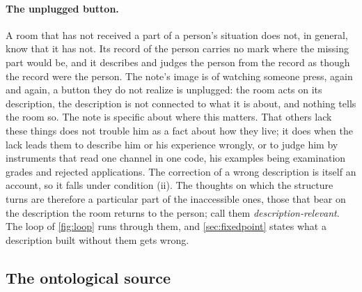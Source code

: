 \paragraph{The unplugged button.} A room that has not received a part of a person's situation does not, in general, know that it has not. Its record of the person carries no mark where the missing part would be, and it describes and judges the person from the record as though the record were the person. The note's image is of watching someone press, again and again, a button they do not realize is unplugged: the room acts on its description, the description is not connected to what it is about, and nothing tells the room so. The note is specific about where this matters. That others lack these things does not trouble him as a fact about how they live; it does when the lack leads them to describe him or his experience wrongly, or to judge him by instruments that read one channel in one code, his examples being examination grades and rejected applications. The correction of a wrong description is itself an account, so it falls under condition (ii). The thoughts on which the structure turns are therefore a particular part of the inaccessible ones, those that bear on the description the room returns to the person; call them \emph{description-relevant}. The loop of \autoref{fig:loop} runs through them, and \autoref{sec:fixedpoint} states what a description built without them gets wrong.

\subsection{The ontological source}\label{sec:source}

